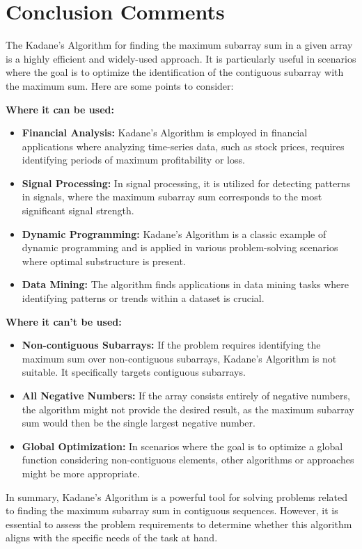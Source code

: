 \documentclass[12pt, a4paper]{report}
\begin{document}
\newpage
\section*{Conclusion Comments}

The Kadane's Algorithm for finding the maximum subarray sum in a given array is a highly efficient and widely-used approach. It is particularly useful in scenarios where the goal is to optimize the identification of the contiguous subarray with the maximum sum. Here are some points to consider:

\textbf{Where it can be used:}

\begin{itemize}
    \item \textbf{Financial Analysis:} Kadane's Algorithm is employed in financial applications where analyzing time-series data, such as stock prices, requires identifying periods of maximum profitability or loss.
    \item \textbf{Signal Processing:} In signal processing, it is utilized for detecting patterns in signals, where the maximum subarray sum corresponds to the most significant signal strength.
    \item \textbf{Dynamic Programming:} Kadane's Algorithm is a classic example of dynamic programming and is applied in various problem-solving scenarios where optimal substructure is present.
    \item \textbf{Data Mining:} The algorithm finds applications in data mining tasks where identifying patterns or trends within a dataset is crucial.
\end{itemize}

\textbf{Where it can't be used:}

\begin{itemize}
    \item \textbf{Non-contiguous Subarrays:} If the problem requires identifying the maximum sum over non-contiguous subarrays, Kadane's Algorithm is not suitable. It specifically targets contiguous subarrays.
    \item \textbf{All Negative Numbers:} If the array consists entirely of negative numbers, the algorithm might not provide the desired result, as the maximum subarray sum would then be the single largest negative number.
    \item \textbf{Global Optimization:} In scenarios where the goal is to optimize a global function considering non-contiguous elements, other algorithms or approaches might be more appropriate.
\end{itemize}
In summary, Kadane's Algorithm is a powerful tool for solving problems related to finding the maximum subarray sum in contiguous sequences. However, it is essential to assess the problem requirements to determine whether this algorithm aligns with the specific needs of the task at hand.
\end{document}
